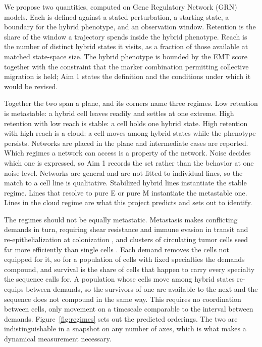 \documentclass[12pt,letterpaper]{article}
\newcommand{\chg}[1]{\textcolor{chgcolor}{#1}}
\newcommand{\chg}[1]{#1}
\begin{document}
{We propose two quantities, computed on Gene Regulatory Network (GRN) models. Each is defined against a stated perturbation, a starting state, a boundary for the hybrid phenotype, and an observation window. Retention is the share of the window a trajectory spends inside the hybrid phenotype. Reach is the number of distinct hybrid states it visits, as a fraction of those available at matched state-space size. The hybrid phenotype is bounded by the EMT score together with the constraint that the marker combination permitting collective migration is held; Aim 1 states the definition and the conditions under which it would be revised.

Together the two span a plane, and its corners name three regimes. Low retention is metastable: a hybrid cell leaves readily and settles at one extreme. High retention with low reach is stable: a cell holds one hybrid state. High retention with high reach is a cloud: a cell moves among hybrid states while the phenotype persists. Networks are placed in the plane and intermediate cases are reported. Which regimes a network can access is a property of the network. Noise decides which one is expressed, so Aim 1 records the set rather than the behavior at one noise level. Networks are general and are not fitted to individual lines, so the match to a cell line is qualitative. Stabilized hybrid lines instantiate the stable regime. Lines that resolve to pure E or pure M instantiate the metastable one. Lines in the cloud regime are what this project predicts and sets out to identify.}

The regimes should not be equally metastatic. Metastasis makes conflicting demands in turn, requiring shear resistance and immune evasion in transit and re-epithelialization at colonization \cite{jolly2019}, and clusters of circulating tumor cells seed far more efficiently than single cells \cite{aceto2014}. \chg{Each demand removes the cells not equipped for it, so for a population of cells with fixed specialties the demands compound, and survival is the share of cells that happen to carry every specialty the sequence calls for. A population whose cells move among hybrid states re-equips between demands, so the survivors of one are available to the next and the sequence does not compound in the same way. This requires no coordination between cells, only movement on a timescale comparable to the interval between demands.} Figure~\ref{fig:regimes} sets out the predicted orderings. The two are indistinguishable in a snapshot on any number of axes, which is what makes a dynamical measurement necessary.
\end{document}
